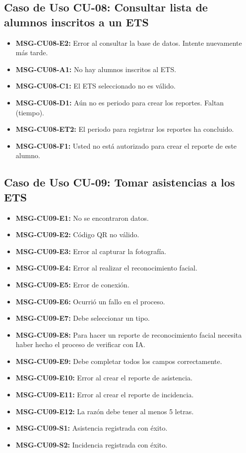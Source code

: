 \subsection{Caso de Uso CU-08: Consultar lista de alumnos inscritos a un ETS}
\begin{itemize}
	\item \textbf{\label{msg:CU08-E2}MSG-CU08-E2:} Error al consultar la base de datos. Intente nuevamente más tarde.
	\item \textbf{\label{msg:CU08-A1}MSG-CU08-A1:} No hay alumnos inscritos al ETS.
	\item \textbf{\label{msg:CU08-C1}MSG-CU08-C1:} El ETS seleccionado no es válido.
	\item \textbf{\label{msg:CU08-D1}MSG-CU08-D1:} Aún no es periodo para crear los reportes. Faltan (tiempo).
	\item \textbf{\label{msg:CU08-ET2}MSG-CU08-ET2:} El periodo para registrar los reportes ha concluido.
	\item \textbf{\label{msg:CU08-F1}MSG-CU08-F1:} Usted no está autorizado para crear el reporte de este alumno.
\end{itemize}

\subsection{Caso de Uso CU-09: Tomar asistencias a los ETS}
\begin{itemize}
	\item \textbf{\label{msg:CU09-E1}MSG-CU09-E1:} No se encontraron datos.
	\item \textbf{\label{msg:CU09-E2}MSG-CU09-E2:} Código QR no válido.
	\item \textbf{\label{msg:CU09-E3}MSG-CU09-E3:} Error al capturar la fotografía.
	\item \textbf{\label{msg:CU09-E4}MSG-CU09-E4:} Error al realizar el reconocimiento facial.
	\item \textbf{\label{msg:CU09-E5}MSG-CU09-E5:} Error de conexión.
	\item \textbf{\label{msg:CU09-E6}MSG-CU09-E6:} Ocurrió un fallo en el proceso.
	\item \textbf{\label{msg:CU09-E7}MSG-CU09-E7:} Debe seleccionar un tipo.
	\item \textbf{\label{msg:CU09-E8}MSG-CU09-E8:} Para hacer un reporte de reconocimiento facial necesita haber hecho el proceso de verificar con IA.
	\item \textbf{\label{msg:CU09-E9}MSG-CU09-E9:} Debe completar todos los campos correctamente.
	\item \textbf{\label{msg:CU09-E10}MSG-CU09-E10:} Error al crear el reporte de asistencia.
	\item \textbf{\label{msg:CU09-E11}MSG-CU09-E11:} Error al crear el reporte de incidencia.
	\item \textbf{\label{msg:CU09-E12}MSG-CU09-E12:} La razón debe tener al menos 5 letras.
	\item \textbf{\label{msg:CU09-S1}MSG-CU09-S1:} Asistencia registrada con éxito.
	\item \textbf{\label{msg:CU09-S2}MSG-CU09-S2:} Incidencia registrada con éxito.
\end{itemize}

